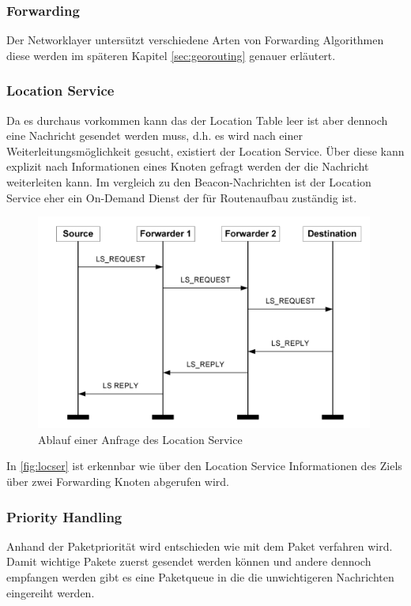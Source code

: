 \subsubsection{Forwarding}
Der Networklayer untersützt verschiedene Arten von Forwarding Algorithmen diese werden im späteren Kapitel \autoref{sec:georouting} genauer erläutert.

\subsubsection{Location Service}
Da es durchaus vorkommen kann das der Location Table leer ist aber dennoch eine Nachricht gesendet werden muss, d.h. es wird nach einer Weiterleitungsmöglichkeit gesucht, existiert der Location Service. Über diese kann explizit nach Informationen eines Knoten gefragt werden der die Nachricht weiterleiten kann. Im vergleich zu den Beacon-Nachrichten ist der Location Service eher ein On-Demand Dienst der für Routenaufbau zuständig ist.
\begin{figure}
\includegraphics[width=0.99\textwidth]{content/images/03_networklayer/location-service-diagramm.jpg}
\caption{Ablauf einer Anfrage des Location Service}
\label{fig:locser}
\end{figure}
In \autoref{fig:locser} ist erkennbar wie über den Location Service Informationen des Ziels über zwei Forwarding Knoten abgerufen wird. 

\subsubsection{Priority Handling}
Anhand der Paketpriorität wird entschieden wie mit dem Paket verfahren wird. Damit wichtige Pakete zuerst gesendet werden können und andere dennoch empfangen werden gibt es eine Paketqueue in die die unwichtigeren Nachrichten eingereiht werden. 


